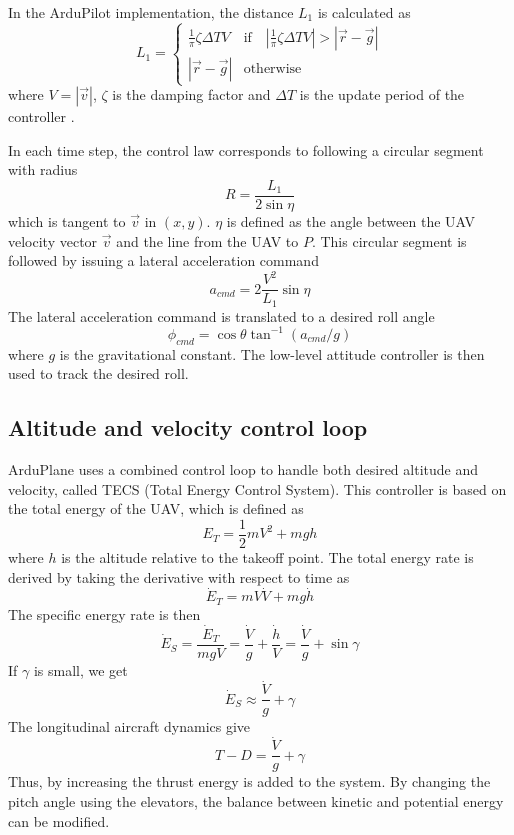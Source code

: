 In the ArduPilot implementation, the distance $L_1$ is calculated as
\begin{equation}\label{eq:ardu_l1}
    L_1=\begin{cases}
        \frac{1}{\pi}\zeta\Delta TV & \mbox{if}\quad |\frac{1}{\pi}\zeta\Delta TV|>|\vec{r}-\vec{g}| \\
        |\vec{r}-\vec{g}| & \mbox{otherwise}
    \end{cases}
\end{equation}
where $V=|\vec{v}|$, $\zeta$ is the damping factor and $\Delta T$ is the update period of the controller \cite{arduplane_l1}.

 In each time step, the control law corresponds to following a circular segment with radius
 \begin{equation}
    R=\frac{L_1}{2\sin\eta}
 \end{equation}
 which is tangent to $\vec{v}$ in $(x,y)$.
 $\eta$ is defined as the angle between the UAV velocity vector $\vec{v}$ and the line from the UAV to $P$.
This circular segment is followed by issuing a lateral acceleration command
\begin{equation}
    a_{cmd}=2\frac{V^2}{L_1}\sin\eta
\end{equation}
The lateral acceleration command is translated to a desired roll angle
\begin{equation}
    \phi_{cmd}=\cos\theta\tan^{-1}(a_{cmd}/g)
\end{equation}
where $g$ is the gravitational constant. The low-level attitude controller is then used to track the desired roll.

\subsection{Altitude and velocity control loop}
ArduPlane uses a combined control loop to handle both desired altitude and velocity, called 
TECS (Total Energy Control System). This controller is based on the total energy of the UAV,
which is defined as
\begin{equation}
    E_T=\frac{1}{2}mV^2 + mgh
\end{equation}
where $h$ is the altitude relative to the takeoff point. The total energy rate is derived
by taking the derivative with respect to time as
\begin{equation}
    \dot{E}_T=mV\dot{V} + mg\dot{h}
\end{equation}
The specific energy rate is then
\begin{equation}
    \dot{E}_S = \frac{\dot{E}_T}{mgV} = \frac{\dot{V}}{g} + \frac{\dot{h}}{V} = \frac{\dot{V}}{g} + \sin\gamma
\end{equation}
If $\gamma$ is small, we get
\begin{equation}
    \dot{E}_S\approx\frac{\dot{V}}{g} + \gamma
\end{equation} 
The longitudinal aircraft dynamics give
\begin{equation}
    T-D=\frac{\dot{V}}{g} + \gamma
\end{equation}
Thus, by increasing the thrust
energy is added to the system. By changing the pitch angle using the elevators, the balance 
between kinetic and potential energy can be modified. 

